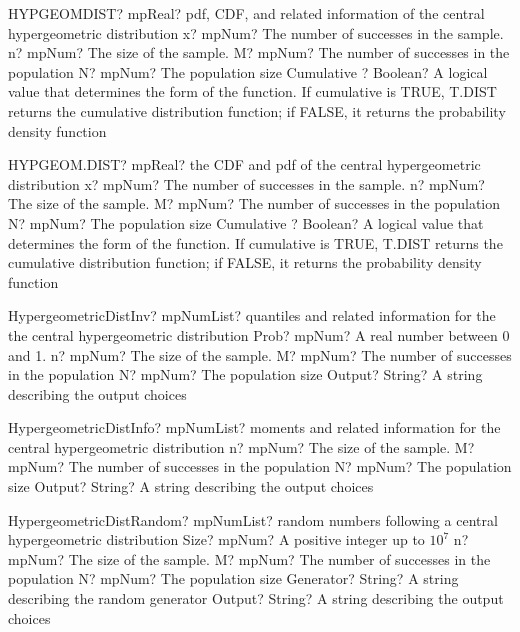 \documentclass[12pt,a4paper,openany]{book}
\begin{document}
\begin{mpFunctionsExtract}
\mpWorksheetFunctionFiveNotImplemented
{HYPGEOMDIST? mpReal? pdf, CDF, and related information of the central hypergeometric distribution}
{x? mpNum? The number of successes in the sample.}
{n? mpNum? The size of the sample.}
{M? mpNum? The number of successes in the population}
{N? mpNum? The population size}
{Cumulative ? Boolean? A logical value that determines the form of the function. If cumulative is TRUE, T.DIST returns the cumulative distribution function; if FALSE, it returns the probability density function}
\end{mpFunctionsExtract}

\begin{mpFunctionsExtract}
\mpWorksheetFunctionFiveNotImplemented
{HYPGEOM.DIST? mpReal? the CDF and pdf of the central hypergeometric distribution}
{x? mpNum? The number of successes in the sample.}
{n? mpNum? The size of the sample.}
{M? mpNum? The number of successes in the population}
{N? mpNum? The population size}
{Cumulative ? Boolean? A logical value that determines the form of the function. If cumulative is TRUE, T.DIST returns the cumulative distribution function; if FALSE, it returns the probability density function}
\end{mpFunctionsExtract}

\begin{mpFunctionsExtract}
\mpFunctionFiveNotImplemented
{HypergeometricDistInv? mpNumList? quantiles and related information for the the central hypergeometric distribution}
{Prob? mpNum? A real number between 0 and 1.}
{n? mpNum? The size of the sample.}
{M? mpNum? The number of successes in the population}
{N? mpNum? The population size}
{Output? String? A string describing the output choices}
\end{mpFunctionsExtract}

\begin{mpFunctionsExtract}
\mpFunctionFourNotImplemented
{HypergeometricDistInfo? mpNumList? moments and related information for the central hypergeometric distribution}
{n? mpNum? The size of the sample.}
{M? mpNum? The number of successes in the population}
{N? mpNum? The population size}
{Output? String? A string describing the output choices}
\end{mpFunctionsExtract}

\begin{mpFunctionsExtract}
\mpFunctionSixNotImplemented
{HypergeometricDistRandom? mpNumList? random numbers following a central hypergeometric distribution}
{Size? mpNum? A positive integer up to $10^7$}
{n? mpNum? The size of the sample.}
{M? mpNum? The number of successes in the population}
{N? mpNum? The population size}
{Generator? String? A string describing the random generator}
{Output? String? A string describing the output choices}
\end{mpFunctionsExtract}
\end{document}
